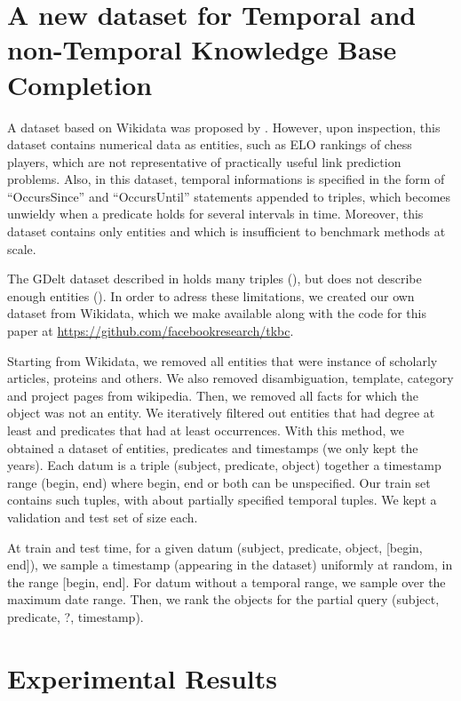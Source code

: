 \documentclass{article}
\begin{document}
\section{A new dataset for Temporal and non-Temporal Knowledge Base Completion}

A dataset based on Wikidata was proposed by \citet{garcia2018learning}. However, upon inspection, this dataset contains numerical data as entities, such as ELO rankings of chess players, which are not representative of practically useful link prediction problems. 
Also, in this dataset, temporal informations is specified in the form of ``OccursSince'' and ``OccursUntil'' statements appended to triples, which becomes unwieldy when a predicate holds for several intervals in time. Moreover, this dataset contains only  entities and  which is insufficient to benchmark methods at scale.

The GDelt dataset described in \citet{ma2018embedding, goel2019diachronic} holds many triples (), but does not describe enough entities (). In order to adress these limitations, we created our own dataset from Wikidata, which we make available along with the code for this paper at \url{https://github.com/facebookresearch/tkbc}.


Starting from Wikidata, we removed all entities that were instance of scholarly articles, proteins and others. We also removed disambiguation, template, category and project pages from wikipedia. Then, we removed all facts for which the object was not an entity. We iteratively filtered out entities that had degree at least  and predicates that had at least  occurrences. With this method, we obtained a dataset of  entities,  predicates and  timestamps (we only kept the years). Each datum is a triple (subject, predicate, object) together a timestamp range (begin, end) where begin, end or both can be unspecified. Our train set contains  such tuples, with about  partially specified temporal tuples. We kept a validation and test set of size  each.

At train and test time, for a given datum (subject, predicate, object, [begin, end]), we sample a timestamp (appearing in the dataset) uniformly at random, in the range [begin, end]. For datum without a temporal range, we sample over the maximum date range. Then, we rank the objects for the partial query (subject, predicate, ?, timestamp).

\section{Experimental Results}
\end{document}
